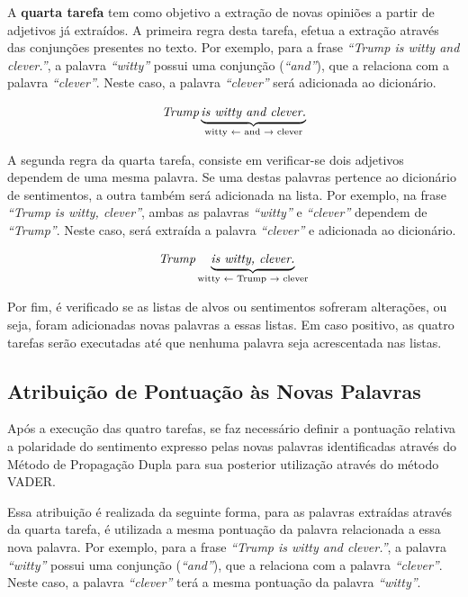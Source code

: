 A \textbf{quarta tarefa} tem como objetivo a extração de novas opiniões a partir
de adjetivos já extraídos. A primeira regra desta tarefa, efetua a extração através
das conjunções presentes no texto. Por exemplo, para a frase \textit{``Trump is
witty and clever.''}, a palavra \textit{``witty''} possui uma conjunção
(\textit{``and''}), que a relaciona com a palavra \textit{``clever''}. Neste
caso, a palavra \textit{``clever''} será adicionada ao dicionário.

\[\textit{Trump} \underbrace{\textit{is witty and clever.}}_\text{witty
\textleftarrow \text{ and} \textrightarrow \text{ clever}}\]


A segunda regra da quarta tarefa, consiste em verificar-se dois adjetivos
dependem de uma mesma palavra. Se uma destas palavras pertence ao dicionário de
sentimentos, a outra também será adicionada na lista. Por exemplo, na frase
\textit{``Trump is witty, clever''}, ambas as palavras \textit{``witty''} e
\textit{``clever''} dependem de \textit{``Trump''}. Neste caso, será extraída a
palavra \textit{``clever''} e adicionada ao dicionário.

\[\textit{Trump} \underbrace{\textit{is witty, clever.}}_\text{witty
\textleftarrow \text{ Trump} \textrightarrow \text{ clever}}\]

Por fim, é verificado se as listas de alvos ou sentimentos sofreram
alterações, ou seja, foram adicionadas novas palavras a essas listas. Em caso
positivo, as quatro tarefas serão executadas até que nenhuma palavra seja
acrescentada nas listas.

\subsection{Atribuição de Pontuação às Novas Palavras}

Após a execução das quatro tarefas, se faz necessário definir a
pontuação relativa a polaridade do sentimento expresso pelas novas palavras
identificadas através do Método de Propagação Dupla para sua posterior
utilização através do método \ac{VADER}.

Essa atribuição é realizada da seguinte forma, para as palavras extraídas
através da quarta tarefa, é utilizada a mesma pontuação da palavra relacionada a
essa nova palavra. Por exemplo, para a frase \textit{``Trump is
witty and clever.''}, a palavra \textit{``witty''} possui uma conjunção
(\textit{``and''}), que a relaciona com a palavra \textit{``clever''}. Neste
caso, a palavra \textit{``clever''} terá a mesma pontuação da palavra
\textit{``witty''}.

